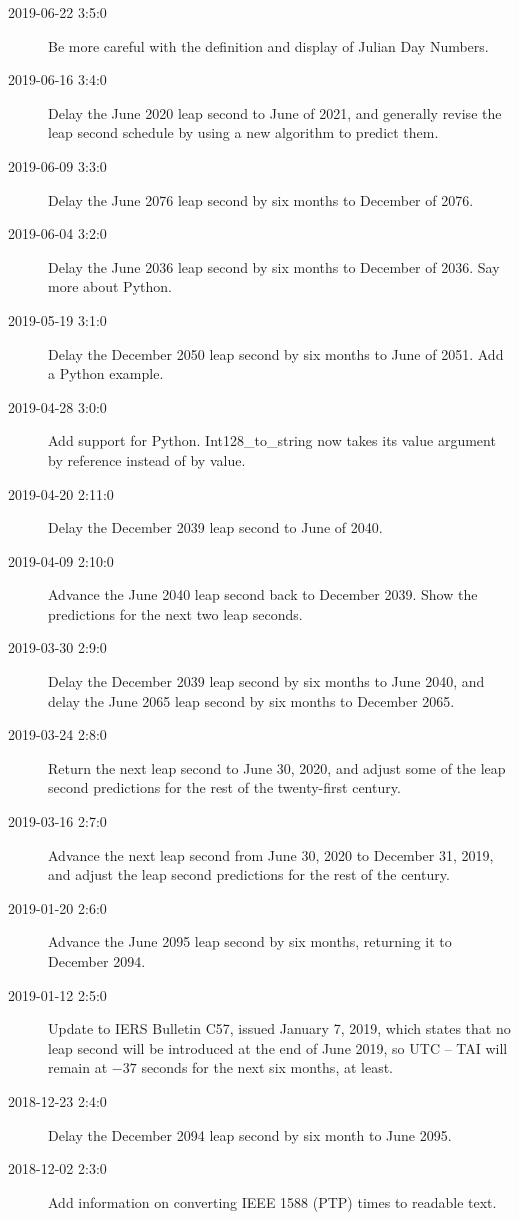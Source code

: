 \documentclass[letterpaper,twoside]{article}
\begin{document}
\begin{description}
\item[2019-06-22 3:5:0] Be more careful with the definition
  and display of Julian Day Numbers.
\item[2019-06-16 3:4:0] Delay the June 2020 leap second to
  June of 2021, and generally revise the leap second schedule
  by using a new algorithm to predict them.
\item[2019-06-09 3:3:0] Delay the June 2076 leap second by
  six months to December of 2076.
\item[2019-06-04 3:2:0] Delay the June 2036 leap second by
  six months to December of 2036.  Say more about Python.
\item[2019-05-19 3:1:0] Delay the December 2050 leap second
  by six months to June of 2051.  Add a Python example.
\item[2019-04-28 3:0:0] Add support for Python.  Int128\_to\_string
  now takes its value argument by reference instead of by value.
\item[2019-04-20 2:11:0] Delay the December 2039 leap second
  to June of 2040.
\item[2019-04-09 2:10:0] Advance the June 2040 leap second back to
  December 2039.  Show the predictions for the next two leap seconds.
\item[2019-03-30 2:9:0] Delay the December 2039 leap second by six
  months to June 2040, and delay the June 2065 leap second by six
  months to December 2065.
\item[2019-03-24 2:8:0] Return the next leap second to June 30, 2020,
  and adjust some of the leap second predictions for the rest of the
  twenty-first century.
\item[2019-03-16 2:7:0] Advance the next leap second from June 30, 2020
  to December 31, 2019, and adjust the leap second predictions
  for the rest of the century.
\item[2019-01-20 2:6:0] Advance the June 2095 leap second by six
  months, returning it to December 2094.
\item[2019-01-12 2:5:0] Update to IERS Bulletin C57, issued January
  7, 2019, which states that no leap second will be introduced
  at the end of June 2019, so UTC -- TAI will remain at
  $-37$ seconds for the next six months, at least.  
\item[2018-12-23 2:4:0] Delay the December 2094 leap second by six month
  to June 2095.
\item[2018-12-02 2:3:0] Add information on converting IEEE 1588 (PTP)
  times to readable text.

\end{description}
\end{document}

